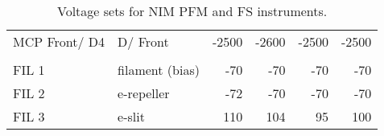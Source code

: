 \begin{small}
\begin{table}[H]
\begin{tabular}{|ll|rrrr|}
			MCP Front/ D4 & D/ Front        & -2500 & -2600 & -2500 & -2500 \\
						  &                 &       &       &       &       \\
			FIL 1         & filament (bias) &   -70 &   -70 &   -70 &   -70 \\
			FIL 2         & e-repeller      &   -72 &   -70 &   -70 &   -70 \\
			FIL 3         & e-slit          &   110 &   104 &    95 &   100 \\
			\hline
		\end{tabular}
		\caption{Voltage sets for NIM PFM and FS instruments.}
		\label{tab:voltageSets}
	\end{table}
	\end{small}
